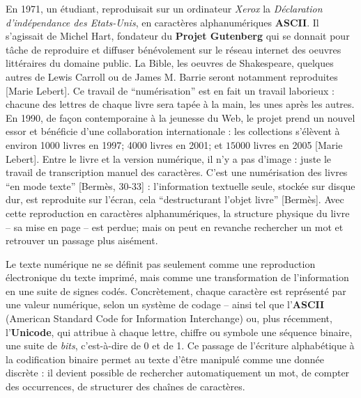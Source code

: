 En 1971, un étudiant, reproduisait sur un ordinateur \emph{Xerox} la \emph{Déclaration d'indépendance des Etats-Unis}, en caractères alphanumériques \textbf{ASCII}. Il s'agissait de Michel Hart, fondateur du \textbf{Projet Gutenberg} qui se donnait pour tâche de reproduire et diffuser bénévolement sur le réseau internet des oeuvres littéraires du domaine public. La Bible, les oeuvres de Shakespeare, quelques autres de Lewis Carroll ou de James M. Barrie seront notamment reproduites [Marie Lebert]. Ce travail de \enquote{numérisation} est en fait un travail laborieux : chacune des lettres de chaque livre sera tapée à la main, les unes après les autres. En 1990, de façon contemporaine à la jeunesse du Web, le projet prend un nouvel essor et bénéficie d'une collaboration internationale : les collections s'élèvent à environ 1000 livres en 1997; 4000 livres en 2001; et $15000$ livres en 2005 [Marie Lebert]. Entre le livre et la version numérique, il n'y a pas d'image : juste le travail de transcription manuel des caractères. C'est une numérisation des livres \enquote{en mode texte} [Bermès, 30-33] : l'information textuelle seule, stockée sur disque dur, est reproduite sur l'écran, cela \enquote{destructurant l'objet livre} [Bermès]. Avec cette reproduction en caractères alphanumériques, la structure physique du livre -- sa mise en page -- est perdue; mais on peut en revanche rechercher un mot et retrouver un passage plus aisément. 

Le texte numérique ne se définit pas seulement comme une reproduction électronique du texte imprimé, mais comme une transformation de l’information en une suite de signes codés. Concrètement, chaque caractère est représenté par une valeur numérique, selon un système de codage -- ainsi tel que l’\textbf{ASCII} (American Standard Code for Information Interchange) ou, plus récemment, l’\textbf{Unicode}, qui attribue à chaque lettre, chiffre ou symbole une séquence binaire, une suite de \emph{bits}, c’est-à-dire de 0 et de 1. Ce passage de l’écriture alphabétique à la codification binaire permet au texte d’être manipulé comme une donnée discrète : il devient possible de rechercher automatiquement un mot, de compter des occurrences, de structurer des chaînes de caractères.

